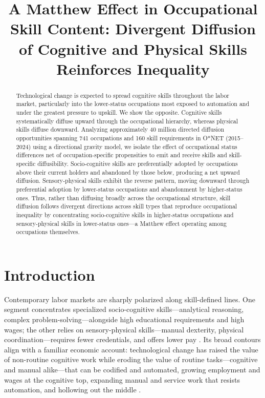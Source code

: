 \documentclass[11pt, letterpaper]{article} %
\title{\textbf{A Matthew Effect in Occupational Skill Content: Divergent Diffusion of Cognitive and Physical Skills Reinforces Inequality}}
\date{}
\newcommand{\parencite}[1]{\cite{#1}}
\begin{document}
\maketitle


\begin{abstract}
Technological change is expected to spread cognitive skills throughout the labor market, particularly into the lower-status occupations most exposed to automation and under the greatest pressure to upskill. We show the opposite. Cognitive skills systematically diffuse upward through the occupational hierarchy, whereas physical skills diffuse downward. Analyzing approximately 40 million directed diffusion opportunities spanning 741 occupations and 160 skill requirements in O*NET (2015--2024) using a directional gravity model, we isolate the effect of occupational status differences net of occupation-specific propensities to emit and receive skills and skill-specific diffusibility. Socio-cognitive skills are preferentially adopted by occupations above their current holders and abandoned by those below, producing a net upward diffusion. Sensory-physical skills exhibit the reverse pattern, moving downward through preferential adoption by lower-status occupations and abandonment by higher-status ones. Thus, rather than diffusing broadly across the occupational structure, skill diffusion follows divergent directions across skill types that reproduce occupational inequality by concentrating socio-cognitive skills in higher-status occupations and sensory-physical skills in lower-status ones---a Matthew effect operating among occupations themselves.
\end{abstract}

\clearpage

\section*{Introduction}

Contemporary labor markets are sharply polarized along skill-defined lines. One segment concentrates specialized socio-cognitive skills---analytical reasoning, complex problem-solving---alongside high educational requirements and high wages; the other relies on sensory-physical skills---manual dexterity, physical coordination---requires fewer credentials, and offers lower pay \parencite{liu_payoff_2013, anderson_skill_2017, alabdulkareem_unpacking_2018, hosseinioun_skill_2025}. Its broad contours align with a familiar economic account: technological change has raised the value of non-routine cognitive work while eroding the value of routine tasks---cognitive and manual alike---that can be codified and automated, growing employment and wages at the cognitive top, expanding manual and service work that resists automation, and hollowing out the middle \parencite{autor_skill_2003, acemoglu_skills_2011, acemoglu_robots_2020, zhang_future_2024}.
\end{document}
